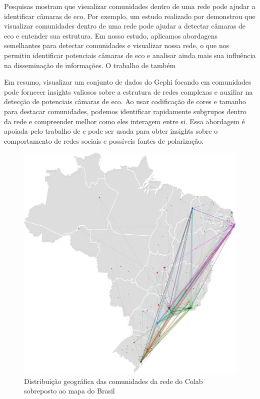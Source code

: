 Pesquisas mostram que visualizar comunidades dentro de uma rede pode ajudar a identificar câmaras de eco. Por exemplo, um estudo realizado por  demonstrou que visualizar comunidades dentro de uma rede pode ajudar a detectar câmaras de eco e entender sua estrutura. Em nosso estudo, aplicamos abordagens semelhantes para detectar comunidades e visualizar nossa rede, o que nos permitiu identificar potenciais câmaras de eco e analisar ainda mais sua influência na disseminação de informações. O trabalho de \cite{2014_Colleoni} também 

Em resumo, visualizar um conjunto de dados do Gephi focando em comunidades pode fornecer insights valiosos sobre a estrutura de redes complexas e auxiliar na detecção de potenciais câmaras de eco. Ao usar codificação de cores e tamanho para destacar comunidades, podemos identificar rapidamente subgrupos dentro da rede e compreender melhor como eles interagem entre si. Essa abordagem é apoiada pelo trabalho de  e pode ser usada para obter insights sobre o comportamento de redes sociais e possíveis fontes de polarização.

\begin{figure}[!hbtp]
	\caption{Distribuição geográfica das comunidades da rede do Colab sobreposto ao mapa do Brasil}
	\label{fig:colab_geoclusters}
	\centering
	\includegraphics[scale=0.2]{images/colab-geocluster.png}
	\fautor
\end{figure}

